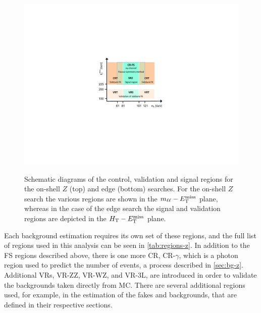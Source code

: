 \begin{figure}[h]
\centering
\includegraphics[width=.8\textwidth]{figures/fs/FSdiagram_v2.pdf}\\
\caption{
Schematic diagrams of the control, validation and signal regions for the on-shell $Z$ (top) and edge (bottom) searches.
For the on-shell $Z$ search the various regions are shown in the $m_{\ell\ell}-E_{\text{T}}^{\text{miss}}$ plane, whereas in the case of the edge search the
signal and validation regions are depicted in the $H_{\text{T}}-E_{\text{T}}^{\text{miss}}$ plane.
\label{fig:region_diagrams}
}
\end{figure}

Each background estimation requires its own set of these regions, and the full list of regions used in this analysis can be seen in \autoref{tab:regions-z}. In addition to the \ac{FS} regions described above, there is one more \ac{CR}, CR-$\gamma$, which is a photon region used to predict the number of \dyjets events, a process described in \autoref{sec:bg-z}. Additional \acp{VR}, VR-ZZ, VR-WZ, and VR-3L, are introduced in order to validate the backgrounds taken directly from \ac{MC}. There are several additional regions used, for example, in the estimation of the fakes and \dyjets backgrounds, that are defined in their respective sections. 

